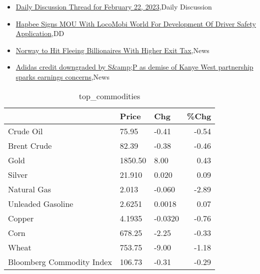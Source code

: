 \documentclass{article}%
\begin{document}
%
\begin{itemize}%
\item%
\href{https://reddit.com/r/wallstreetbets/comments/118vbld/daily\_discussion\_thread\_for\_february\_22\_2023/}{Daily Discussion Thread for February 22, 2023},Daily Discussion%
\item%
\href{https://reddit.com/r/Baystreetbets/comments/1187du2/hapbee\_signs\_mou\_with\_locomobi\_world\_for/}{Hapbee Signs MOU With LocoMobi World For Development Of Driver Safety Application},DD%
\item%
\href{https://reddit.com/r/Economics/comments/118h1u3/norway\_to\_hit\_fleeing\_billionaires\_with\_higher/}{Norway to Hit Fleeing Billionaires With Higher Exit Tax},News%
\item%
\href{https://reddit.com/r/Economics/comments/118f3cc/adidas\_credit\_downgraded\_by\_sp\_as\_demise\_of\_kanye/}{Adidas credit downgraded by S\&amp;P as demise of Kanye West partnership sparks earnings concerns},News%
\end{itemize}%


\begin{table}[htbp]%
\caption{top\_commodities}%
\centering%
\begin{adjustbox}{width=1\textwidth}%
\begin{tabular}{lllr}
\toprule
                          &   Price &     Chg &  \%Chg \\
\midrule
               Crude Oil  &   75.95 &   -0.41 & -0.54 \\
             Brent Crude  &   82.39 &   -0.38 & -0.46 \\
                    Gold  & 1850.50 &    8.00 &  0.43 \\
                  Silver  &  21.910 &   0.020 &  0.09 \\
             Natural Gas  &   2.013 &  -0.060 & -2.89 \\
       Unleaded Gasoline  &  2.6251 &  0.0018 &  0.07 \\
                  Copper  &  4.1935 & -0.0320 & -0.76 \\
                    Corn  &  678.25 &   -2.25 & -0.33 \\
                   Wheat  &  753.75 &   -9.00 & -1.18 \\
Bloomberg Commodity Index &  106.73 &   -0.31 & -0.29 \\
\bottomrule
\end{tabular}
%
\end{adjustbox}%
\end{table}
\end{document}
